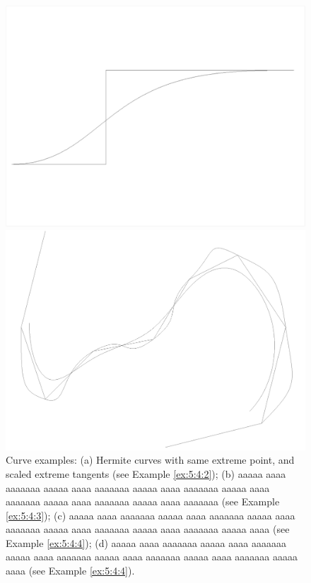 \begin{coding}[Algebraic computation of FE = $\delta_1$]
{\begin{figure}[htbp]
	\begin{minipage}[c]{0.5\linewidth}
   	\includegraphics[width=\linewidth]{chapter-05/figs/bezier.pdf} 
	\end{minipage}%
	\begin{minipage}[c]{0.5\linewidth}
   	\includegraphics[width=\linewidth]{chapter-05/figs/nubspline.pdf} 
	\end{minipage}%

   \caption{Curve examples: (a) Hermite curves with same extreme point, and scaled extreme tangents (see Example \ref{ex:5:4:2}); (b) aaaaa aaaa aaaaaaa aaaaa aaaa aaaaaaa aaaaa aaaa aaaaaaa aaaaa aaaa aaaaaaa aaaaa aaaa aaaaaaa aaaaa aaaa aaaaaaa (see Example \ref{ex:5:4:3}); (c) aaaaa aaaa aaaaaaa aaaaa aaaa aaaaaaa aaaaa aaaa aaaaaaa aaaaa aaaa aaaaaaa aaaaa aaaa aaaaaaa aaaaa aaaa (see Example \ref{ex:5:4:4}); (d) aaaaa aaaa aaaaaaa aaaaa aaaa aaaaaaa aaaaa aaaa aaaaaaa aaaaa aaaa aaaaaaa aaaaa aaaa aaaaaaa aaaaa aaaa (see Example \ref{ex:5:4:4}). }
   \label{fig:5:7}
\end{figure}


}
\end{coding}
